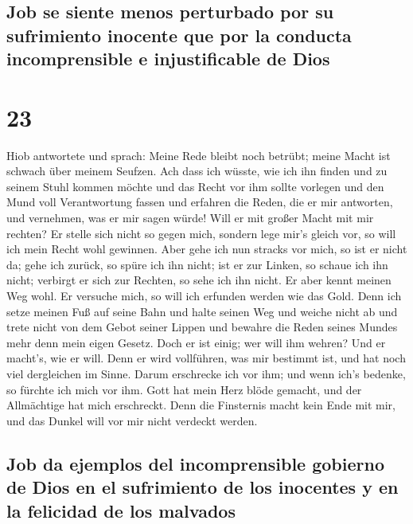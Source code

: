 \hypertarget{job-se-siente-menos-perturbado-por-su-sufrimiento-inocente-que-por-la-conducta-incomprensible-e-injustificable-de-dios}{%
\subsection{Job se siente menos perturbado por su sufrimiento inocente
que por la conducta incomprensible e injustificable de
Dios}\label{job-se-siente-menos-perturbado-por-su-sufrimiento-inocente-que-por-la-conducta-incomprensible-e-injustificable-de-dios}}

\hypertarget{section-22}{%
\section{23}\label{section-22}}

 Hiob antwortete und sprach:  Meine Rede
bleibt noch betrübt; meine Macht ist schwach über meinem Seufzen.
 Ach dass ich wüsste, wie ich ihn finden und zu seinem
Stuhl kommen möchte  und das Recht vor ihm sollte vorlegen
und den Mund voll Verantwortung fassen  und erfahren die
Reden, die er mir antworten, und vernehmen, was er mir sagen würde!
 Will er mit großer Macht mit mir rechten? Er stelle sich
nicht so gegen mich,  sondern lege mir's gleich vor, so
will ich mein Recht wohl gewinnen.  Aber gehe ich nun
stracks vor mich, so ist er nicht da; gehe ich zurück, so spüre ich ihn
nicht;  ist er zur Linken, so schaue ich ihn nicht;
verbirgt er sich zur Rechten, so sehe ich ihn nicht.  Er
aber kennt meinen Weg wohl. Er versuche mich, so will ich erfunden
werden wie das Gold.  Denn ich setze meinen Fuß auf seine
Bahn und halte seinen Weg und weiche nicht ab  und trete
nicht von dem Gebot seiner Lippen und bewahre die Reden seines Mundes
mehr denn mein eigen Gesetz.  Doch er ist einig; wer will
ihm wehren? Und er macht's, wie er will.  Denn er wird
vollführen, was mir bestimmt ist, und hat noch viel dergleichen im
Sinne.  Darum erschrecke ich vor ihm; und wenn ich's
bedenke, so fürchte ich mich vor ihm.  Gott hat mein Herz
blöde gemacht, und der Allmächtige hat mich erschreckt. 
Denn die Finsternis macht kein Ende mit mir, und das Dunkel will vor mir
nicht verdeckt werden.

\hypertarget{job-da-ejemplos-del-incomprensible-gobierno-de-dios-en-el-sufrimiento-de-los-inocentes-y-en-la-felicidad-de-los-malvados}{%
\subsection{Job da ejemplos del incomprensible gobierno de Dios en el
sufrimiento de los inocentes y en la felicidad de los
malvados}\label{job-da-ejemplos-del-incomprensible-gobierno-de-dios-en-el-sufrimiento-de-los-inocentes-y-en-la-felicidad-de-los-malvados}}

